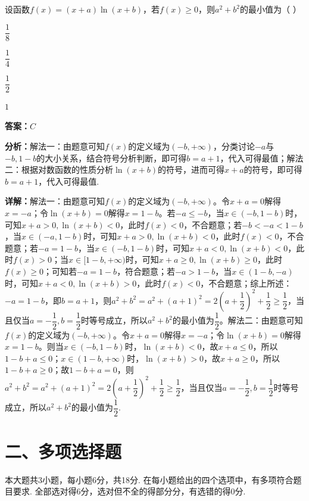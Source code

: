 \begin{question}[points=5]
设函数$f(x)=(x+a)\ln(x+b)$，若$f(x)\ge 0$，则$a^2+b^2$的最小值为（ ）
\begin{choices}
  \item $\dfrac{1}{8}$
  \item $\dfrac{1}{4}$
  \item $\dfrac{1}{2}$
  \item $1$
\end{choices}
\begin{solution}
\textbf{答案：}$C$

\textbf{分析：}解法一：由题意可知$f(x)$的定义域为$(-b,+\infty)$，分类讨论$-a$与$-b,1-b$的大小关系，结合符号分析判断，即可得$b=a+1$，代入可得最值；解法二：根据对数函数的性质分析$\ln(x+b)$的符号，进而可得$x+a$的符号，即可得$b=a+1$，代入可得最值.

\textbf{详解：}解法一：由题意可知$f(x)$的定义域为$(-b,+\infty)$。令$x+a=0$解得$x=-a$；令$\ln(x+b)=0$解得$x=1-b$。若$-a\le -b$，当$x\in(-b,1-b)$时，可知$x+a>0,\ln(x+b)<0$，此时$f(x)<0$，不合题意；若$-b<-a<1-b$，当$x\in(-a,1-b)$时，可知$x+a>0,\ln(x+b)<0$，此时$f(x)<0$，不合题意；若$-a=1-b$，当$x\in(-b,1-b)$时，可知$x+a<0,\ln(x+b)<0$，此时$f(x)>0$；当$x\in[1-b,+\infty)$时，可知$x+a\ge0,\ln(x+b)\ge0$，此时$f(x)\ge0$；可知若$-a=1-b$，符合题意；若$-a>1-b$，当$x\in(1-b,-a)$时，可知$x+a<0,\ln(x+b)>0$，此时$f(x)<0$，不合题意；综上所述：$-a=1-b$，即$b=a+1$，则$a^2+b^2=a^2+(a+1)^2=2\left(a+\dfrac{1}{2}\right)^2+\dfrac{1}{2}\ge\dfrac{1}{2}$，当且仅当$a=-\dfrac{1}{2},b=\dfrac{1}{2}$时等号成立，所以$a^2+b^2$的最小值为$\dfrac{1}{2}$。解法二：由题意可知$f(x)$的定义域为$(-b,+\infty)$。令$x+a=0$解得$x=-a$；令$\ln(x+b)=0$解得$x=1-b$。则当$x\in(-b,1-b)$时，$\ln(x+b)<0$，故$x+a\le0$，所以$1-b+a\le0$；$x\in(1-b,+\infty)$时，$\ln(x+b)>0$，故$x+a\ge0$，所以$1-b+a\ge0$；故$1-b+a=0$，则$a^2+b^2=a^2+(a+1)^2=2\left(a+\dfrac{1}{2}\right)^2+\dfrac{1}{2}\ge\dfrac{1}{2}$，当且仅当$a=-\dfrac{1}{2},b=\dfrac{1}{2}$时等号成立，所以$a^2+b^2$的最小值为$\dfrac{1}{2}$.
\end{solution}
\end{question}

\section*{二、多项选择题}
本大题共3小题，每小题6分，共18分. 在每小题给出的四个选项中，有多项符合题目要求. 全部选对得6分，选对但不全的得部分分，有选错的得0分.


